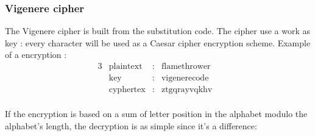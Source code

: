 \subsubsection{ Vigenere cipher }

The  Vigenere cipher is built from the substitution code. The cipher use a work as key : every character will be used as a Caesar cipher encryption scheme. 
Example of a encryption : 
\begin{alignat*}{3}
    &\text{plaintext}   & : & \text{flamethrower}&  \\
    &\text{key}         & : & \text{vigenerecode}&  \\
    &\text{cyphertex}   & : & \text{ztgqrayvqkhv}&  \\ 
\end{alignat*}


\begin{table}[h!]
    \centering
	\caption{Exemple of a encryption using the vigenere code}
	\label{tab:ExempleVigenereEncryption}
\end{table}

If the encryption is based on a sum of letter position in the alphabet modulo the alphabet's length, the decryption is as simple since it's a difference: 

\begin{table}[h!]
    \centering
	\caption{Exemple of a decryption using the vigenere code}
	\label{tab:ExempleVigenereDecryption}
\end{table}



